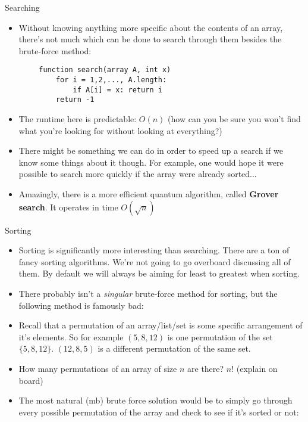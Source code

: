 \documentclass{beamer}
\begin{document}
\begin{frame}[fragile]{Searching}
    \begin{itemize}
        \item Without knowing anything more specific about the contents of an array, there's not much which can be done to search through them besides the brute-force method:
    \end{itemize}
    \begin{lstlisting}
        function search(array A, int x)
            for i = 1,2,..., A.length:    
                if A[i] = x: return i
            return -1
    \end{lstlisting}
    \begin{itemize}
        \item The runtime here is predictable: $O(n)$ (how can you be sure you won't find what you're looking for without looking at everything?)
        \pause
        \item There might be something we can do in order to speed up a search if we know some things about it though. For example, one would hope it were possible to search more quickly if the array were already sorted...
        \pause
        \item Amazingly, there is a more efficient quantum algorithm, called \textbf{Grover search}. It operates in time $O(\sqrt{n})$
    \end{itemize}
\end{frame}

\begin{frame}{Sorting}
    \begin{itemize}
        \item Sorting is significantly more interesting than searching. There are a ton of fancy sorting algorithms. We're not going to go overboard discussing all of them. By default we will always be aiming for least to greatest when sorting. 
        \pause
        \item There probably isn't a \emph{singular} brute-force method for sorting, but the following method is famously bad:
        \item Recall that a permutation of an array/list/set is some specific arrangement of it's elements. So for example $(5,8,12)$ is one permutation of the set $\{5,8,12\}$. $(12,8,5)$ is a different permutation of the same set.
        \item How many permutations of an array of size $n$ are there? \pause $n!$ (explain on board)
        \item The most natural (mb) brute force solution would be to simply go through every possible permutation of the array and check to see if it's sorted or not:
    \end{itemize}
\end{frame}
\end{document}
